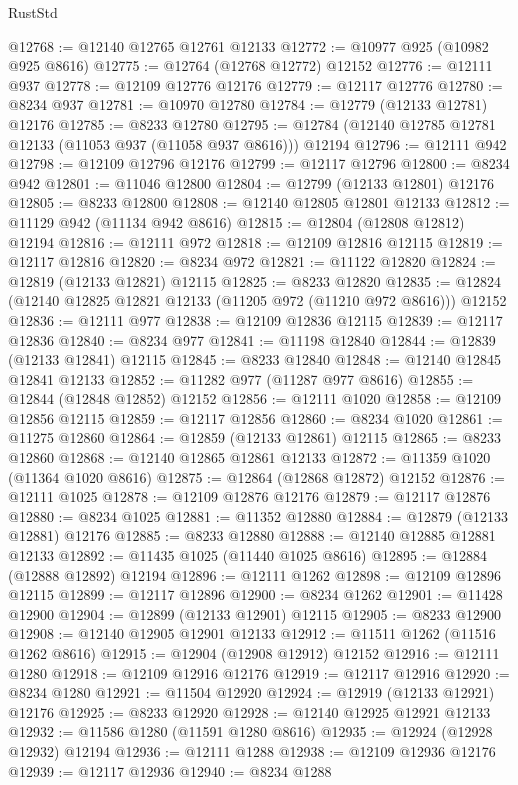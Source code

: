 \begin{lexlean}{RustStd}
\begin{coremodule}
@12768 := @12140 @12765 @12761 @12133
@12772 := @10977 @925 (@10982 @925 @8616)
@12775 := @12764 (@12768 @12772) @12152
@12776 := @12111 @937
@12778 := @12109 @12776 @12176
@12779 := @12117 @12776
@12780 := @8234 @937
@12781 := @10970 @12780
@12784 := @12779 (@12133 @12781) @12176
@12785 := @8233 @12780
@12795 := @12784 (@12140 @12785 @12781 @12133 (@11053 @937 (@11058 @937 @8616))) @12194
@12796 := @12111 @942
@12798 := @12109 @12796 @12176
@12799 := @12117 @12796
@12800 := @8234 @942
@12801 := @11046 @12800
@12804 := @12799 (@12133 @12801) @12176
@12805 := @8233 @12800
@12808 := @12140 @12805 @12801 @12133
@12812 := @11129 @942 (@11134 @942 @8616)
@12815 := @12804 (@12808 @12812) @12194
@12816 := @12111 @972
@12818 := @12109 @12816 @12115
@12819 := @12117 @12816
@12820 := @8234 @972
@12821 := @11122 @12820
@12824 := @12819 (@12133 @12821) @12115
@12825 := @8233 @12820
@12835 := @12824 (@12140 @12825 @12821 @12133 (@11205 @972 (@11210 @972 @8616))) @12152
@12836 := @12111 @977
@12838 := @12109 @12836 @12115
@12839 := @12117 @12836
@12840 := @8234 @977
@12841 := @11198 @12840
@12844 := @12839 (@12133 @12841) @12115
@12845 := @8233 @12840
@12848 := @12140 @12845 @12841 @12133
@12852 := @11282 @977 (@11287 @977 @8616)
@12855 := @12844 (@12848 @12852) @12152
@12856 := @12111 @1020
@12858 := @12109 @12856 @12115
@12859 := @12117 @12856
@12860 := @8234 @1020
@12861 := @11275 @12860
@12864 := @12859 (@12133 @12861) @12115
@12865 := @8233 @12860
@12868 := @12140 @12865 @12861 @12133
@12872 := @11359 @1020 (@11364 @1020 @8616)
@12875 := @12864 (@12868 @12872) @12152
@12876 := @12111 @1025
@12878 := @12109 @12876 @12176
@12879 := @12117 @12876
@12880 := @8234 @1025
@12881 := @11352 @12880
@12884 := @12879 (@12133 @12881) @12176
@12885 := @8233 @12880
@12888 := @12140 @12885 @12881 @12133
@12892 := @11435 @1025 (@11440 @1025 @8616)
@12895 := @12884 (@12888 @12892) @12194
@12896 := @12111 @1262
@12898 := @12109 @12896 @12115
@12899 := @12117 @12896
@12900 := @8234 @1262
@12901 := @11428 @12900
@12904 := @12899 (@12133 @12901) @12115
@12905 := @8233 @12900
@12908 := @12140 @12905 @12901 @12133
@12912 := @11511 @1262 (@11516 @1262 @8616)
@12915 := @12904 (@12908 @12912) @12152
@12916 := @12111 @1280
@12918 := @12109 @12916 @12176
@12919 := @12117 @12916
@12920 := @8234 @1280
@12921 := @11504 @12920
@12924 := @12919 (@12133 @12921) @12176
@12925 := @8233 @12920
@12928 := @12140 @12925 @12921 @12133
@12932 := @11586 @1280 (@11591 @1280 @8616)
@12935 := @12924 (@12928 @12932) @12194
@12936 := @12111 @1288
@12938 := @12109 @12936 @12176
@12939 := @12117 @12936
@12940 := @8234 @1288

\end{coremodule}
\end{lexlean}
